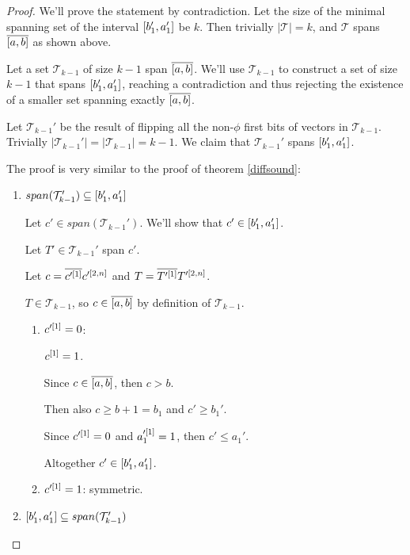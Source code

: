 \documentclass{article}
\begin{document}
\begin{proof}
We'll prove the statement by contradiction.
Let the size of the minimal spanning set
of the interval $[b_1', a_1']$ be $k$.
Then trivially $|\mathcal{T}| = k$,
and $\mathcal{T}$ spans $\overline{[a, b]}$ as shown above.

Let a set $\mathcal{T}_{k-1}$ of size $k-1$
span $\overline{[a, b]}$.
We'll use $\mathcal{T}_{k-1}$ to construct
a set of size $k-1$ that spans $[b_1', a_1']$,
reaching a contradiction
and thus rejecting the existence
of a smaller set spanning exactly $\overline{[a, b]}$.

Let $\mathcal{T}_{k-1}'$ be the result of flipping all
the non-$\phi$ first bits
of vectors in $\mathcal{T}_{k-1}$.
Trivially
$|\mathcal{T}_{k-1}'| = |\mathcal{T}_{k-1}| = k-1$.
We claim that $\mathcal{T}_{k-1}'$
spans $[b_1', a_1']$.

The proof is very similar
to the proof of theorem \ref{diffsound}:

\begin{enumerate}
\item
$span(\mathcal{T}_{k-1}') \subseteq [b_1', a_1']$

Let $c' \in span(\mathcal{T}_{k-1}')$.
We'll show that $c' \in [b_1', a_1']$.

Let $T' \in \mathcal{T}_{k-1}'$ span $c'$.

Let $c = \overline{c'^{[1]}} c'^{[2, n]}$
and $T = \overline{T'^{[1]}} T'^{[2, n]}$.

$T \in \mathcal{T}_{k-1}$,
so $c \in \overline{[a, b]}$
by definition of $\mathcal{T}_{k-1}$.

\begin{enumerate}
\item $c'^{[1]} = 0$:

$c^{[1]} = 1$.

Since $c \in \overline{[a, b]}$, then $c > b$.

Then also
$c \geq b + 1 = b_1$
and
$c' \geq b_1'$.

Since $c'^{[1]} = 0$ and $a_1'^{[1]} = 1$,
then $c' \leq a_1'$.

Altogether $c' \in [b_1', a_1']$.

\item $c'^{[1]} = 1$: symmetric.
\end{enumerate}

\item
$[b_1', a_1'] \subseteq span(\mathcal{T}_{k-1}')$


\end{enumerate}
\end{proof}
\end{document}
